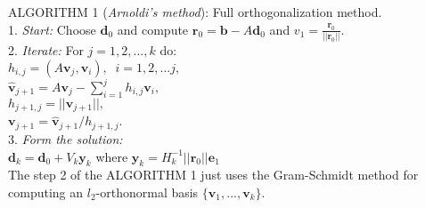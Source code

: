 ALGORITHM 1 (\textit{Arnoldi's method}): Full orthogonalization method.\\
1. \textit{Start:} Choose $\textbf{d}_0$ and compute $\textbf{r}_0 = \textbf{b}- A \textbf{d}_0$ and $v_1 = \frac{\textbf{r}_0}{||\textbf{r}_0||}$. \\
2. \textit{Iterate:} For $j=1,2,...,k$ do:\\
\hspace*{1cm} $h_{i,j} = (A\textbf{v}_j,\textbf{v}_i),\;\; i = 1,2,...j,$\\ 
\hspace*{1cm} $\hat{\textbf{v}}_{j+1} = A\textbf{v}_j - \sum_{i=1}^{j}h_{i,j}\textbf{v}_i,$ \\
\hspace*{1cm} $ h_{j+1,j} = ||\hat{\textbf{v}}_{j+1}||,$\\
\hspace*{1cm} $\textbf{v}_{j+1} = \hat{\textbf{v}}_{j+1}/h_{j+1,j}$.\\
3. \textit{Form the solution:} \\
\hspace*{1cm} $\textbf{d}_k = \textbf{d}_0 + V_k \textbf{y}_k$  where  $\textbf{y}_k = H^{-1}_k ||\textbf{r}_0||\textbf{e}_1$ \\
The step 2 of the ALGORITHM 1 just uses the Gram-Schmidt method for computing an $l_2$-orthonormal basis $\{\textbf{v}_1, ..., \textbf{v}_k \}$. \\

